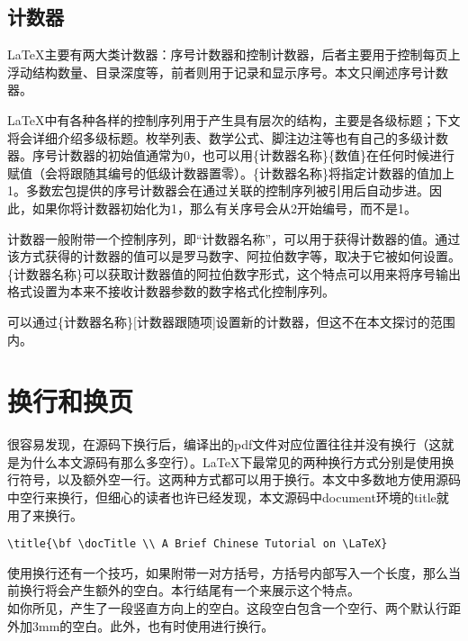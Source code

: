\subsection{计数器}

\LaTeX 主要有两大类计数器：序号计数器和控制计数器，后者主要用于控制每页上浮动结构数量、目录深度等，前者则用于记录和显示序号。本文只阐述序号计数器。

\LaTeX 中有各种各样的控制序列用于产生具有层次的结构，主要是各级标题；下文将会详细介绍多级标题。枚举列表、数学公式、脚注边注等也有自己的多级计数器。序号计数器的初始值通常为0，也可以用\{计数器名称\}\{数值\}在任何时候进行赋值（会将跟随其编号的低级计数器置零）。\{计数器名称\}将指定计数器的值加上1。多数宏包提供的序号计数器会在通过关联的控制序列被引用后自动步进。因此，如果你将计数器初始化为1，那么有关序号会从2开始编号，而不是1。

计数器一般附带一个控制序列，即“计数器名称”，可以用于获得计数器的值。通过该方式获得的计数器的值可以是罗马数字、阿拉伯数字等，取决于它被如何设置。\{计数器名称\}可以获取计数器值的阿拉伯数字形式，这个特点可以用来将序号输出格式设置为本来不接收计数器参数的数字格式化控制序列。

可以通过\{计数器名称\}[计数器跟随项]设置新的计数器，但这不在本文探讨的范围内。

\section{换行和换页}

很容易发现，在源码下换行后，编译出的pdf文件对应位置往往并没有换行（这就是为什么本文源码有那么多空行）。\LaTeX 下最常见的两种换行方式分别是使用换行符号\textlb，以及额外空一行。这两种方式都可以用于换行。本文中多数地方使用源码中空行来换行，但细心的读者也许已经发现，本文源码中document环境的title就用了\textlb 来换行。

\begin{lstlisting}[style = latex_texworks, numbers = none]
\title{\bf \docTitle \\ A Brief Chinese Tutorial on \LaTeX}
\end{lstlisting}

使用\textlb 换行还有一个技巧，如果附带一对方括号，方括号内部写入一个长度，那么当前换行将会产生额外的空白。本行结尾有一个\textlb[3mm]来展示这个特点。\\[3mm]

如你所见，产生了一段竖直方向上的空白。这段空白包含一个空行、两个默认行距外加3mm的空白。此外，也有时使用进行换行。

